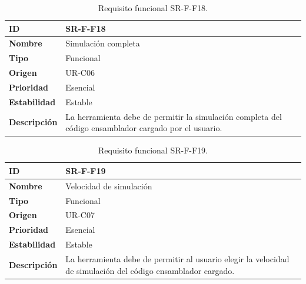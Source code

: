 \begin{center}
\begin{table}[htbp]
\centering
\caption{Requisito funcional SR-F-F18.}
\begin{tabular}{@{}p{2.5cm} p{9cm}@{}} 
\toprule
\textbf{ID} 				& SR-F-F18 \\
\midrule
\textbf{Nombre} 			& Simulación completa\\
\midrule
\textbf{Tipo} 			& Funcional \\
\midrule
\textbf{Origen} 			& UR-C06 \\
\midrule
\textbf{Prioridad}		& Esencial \\
\midrule
\textbf{Estabilidad} 		& Estable \\
\midrule
\textbf{Descripción} 	& La herramienta debe de permitir la simulación completa del código ensamblador cargado por el usuario. \\
\bottomrule
\end{tabular}
\label{tab:srff18}
\end{table}
\end{center}

\begin{center}
\begin{table}[htbp]
\centering
\caption{Requisito funcional SR-F-F19.}
\begin{tabular}{@{}p{2.5cm} p{9cm}@{}} 
\toprule
\textbf{ID} 				& SR-F-F19 \\
\midrule
\textbf{Nombre} 			& Velocidad de simulación\\
\midrule
\textbf{Tipo} 			& Funcional \\
\midrule
\textbf{Origen} 			& UR-C07 \\
\midrule
\textbf{Prioridad}		& Esencial \\
\midrule
\textbf{Estabilidad} 		& Estable \\
\midrule
\textbf{Descripción} 	& La herramienta debe de permitir al usuario elegir la velocidad de simulación del código ensamblador cargado. \\
\bottomrule
\end{tabular}
\label{tab:srff19}
\end{table}
\end{center}

